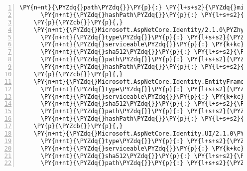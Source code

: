 \begin{Verbatim}[commandchars=\\\{\},numbers=left,firstnumber=1,stepnumber=1,numberblanklines=0]
      \PY{n+nt}{\PYZdq{}path\PYZdq{}}\PY{p}{:} \PY{l+s+s2}{\PYZdq{}microsoft.aspnetcore.httpspolicy/2.1.0\PYZhy{}rc1\PYZhy{}final\PYZdq{}}\PY{p}{,}
      \PY{n+nt}{\PYZdq{}hashPath\PYZdq{}}\PY{p}{:} \PY{l+s+s2}{\PYZdq{}microsoft.aspnetcore.httpspolicy.2.1.0\PYZhy{}rc1\PYZhy{}final.nupkg.sha512\PYZdq{}}
    \PY{p}{\PYZcb{}}\PY{p}{,}
    \PY{n+nt}{\PYZdq{}Microsoft.AspNetCore.Identity/2.1.0\PYZhy{}rc1\PYZhy{}final\PYZdq{}}\PY{p}{:} \PY{p}{\PYZob{}}
      \PY{n+nt}{\PYZdq{}type\PYZdq{}}\PY{p}{:} \PY{l+s+s2}{\PYZdq{}package\PYZdq{}}\PY{p}{,}
      \PY{n+nt}{\PYZdq{}serviceable\PYZdq{}}\PY{p}{:} \PY{k+kc}{true}\PY{p}{,}
      \PY{n+nt}{\PYZdq{}sha512\PYZdq{}}\PY{p}{:} \PY{l+s+s2}{\PYZdq{}sha512\PYZhy{}JvuLEG46AC+IKA4obQd2L4Y+FmXbAB8sdxWfY5vjyr7RZgCDsL3kl+GVRixJeFWZRPDjHv9RhZjN0pFihZwdUw==\PYZdq{}}\PY{p}{,}
      \PY{n+nt}{\PYZdq{}path\PYZdq{}}\PY{p}{:} \PY{l+s+s2}{\PYZdq{}microsoft.aspnetcore.identity/2.1.0\PYZhy{}rc1\PYZhy{}final\PYZdq{}}\PY{p}{,}
      \PY{n+nt}{\PYZdq{}hashPath\PYZdq{}}\PY{p}{:} \PY{l+s+s2}{\PYZdq{}microsoft.aspnetcore.identity.2.1.0\PYZhy{}rc1\PYZhy{}final.nupkg.sha512\PYZdq{}}
    \PY{p}{\PYZcb{}}\PY{p}{,}
    \PY{n+nt}{\PYZdq{}Microsoft.AspNetCore.Identity.EntityFrameworkCore/2.1.0\PYZhy{}rc1\PYZhy{}final\PYZdq{}}\PY{p}{:} \PY{p}{\PYZob{}}
      \PY{n+nt}{\PYZdq{}type\PYZdq{}}\PY{p}{:} \PY{l+s+s2}{\PYZdq{}package\PYZdq{}}\PY{p}{,}
      \PY{n+nt}{\PYZdq{}serviceable\PYZdq{}}\PY{p}{:} \PY{k+kc}{true}\PY{p}{,}
      \PY{n+nt}{\PYZdq{}sha512\PYZdq{}}\PY{p}{:} \PY{l+s+s2}{\PYZdq{}sha512\PYZhy{}cJFIjihBvHeC5gqbH6+mvYI6+kGH8yWOOECQle87TwkbR7h1QFbOyQu8oysLQvnrdfD2NC4RWzmqsBCAs0Eoog==\PYZdq{}}\PY{p}{,}
      \PY{n+nt}{\PYZdq{}path\PYZdq{}}\PY{p}{:} \PY{l+s+s2}{\PYZdq{}microsoft.aspnetcore.identity.entityframeworkcore/2.1.0\PYZhy{}rc1\PYZhy{}final\PYZdq{}}\PY{p}{,}
      \PY{n+nt}{\PYZdq{}hashPath\PYZdq{}}\PY{p}{:} \PY{l+s+s2}{\PYZdq{}microsoft.aspnetcore.identity.entityframeworkcore.2.1.0\PYZhy{}rc1\PYZhy{}final.nupkg.sha512\PYZdq{}}
    \PY{p}{\PYZcb{}}\PY{p}{,}
    \PY{n+nt}{\PYZdq{}Microsoft.AspNetCore.Identity.UI/2.1.0\PYZhy{}rc1\PYZhy{}final\PYZdq{}}\PY{p}{:} \PY{p}{\PYZob{}}
      \PY{n+nt}{\PYZdq{}type\PYZdq{}}\PY{p}{:} \PY{l+s+s2}{\PYZdq{}package\PYZdq{}}\PY{p}{,}
      \PY{n+nt}{\PYZdq{}serviceable\PYZdq{}}\PY{p}{:} \PY{k+kc}{true}\PY{p}{,}
      \PY{n+nt}{\PYZdq{}sha512\PYZdq{}}\PY{p}{:} \PY{l+s+s2}{\PYZdq{}sha512\PYZhy{}DdHxGJ5mhI3nWAJkg3l1nPtaJN4D/P4B9xm/qX4eEX9/S5Qfxvp7GmHMStwToyaHW/Uxi1yXKZHRzgmlIkKkww==\PYZdq{}}\PY{p}{,}
      \PY{n+nt}{\PYZdq{}path\PYZdq{}}\PY{p}{:} \PY{l+s+s2}{\PYZdq{}microsoft.aspnetcore.identity.ui/2.1.0\PYZhy{}rc1\PYZhy{}final\PYZdq{}}\PY{p}{,}

\end{Verbatim}
